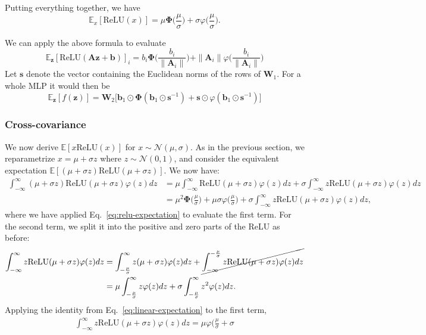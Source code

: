 \documentclass{article}
\theoremstyle{plain}
\theoremstyle{definition}
\theoremstyle{remark}
\newcommand{\Pphi}{\boldsymbol{\Phi}}
\newcommand{\E}{\mathbb{E}}
\newcommand{\zz}{\boldsymbol{z}}
\begin{document}
Putting everything together, we have
\begin{equation}\label{eq:relu-expectation}
    \E_x [\mathrm{ReLU}(x)] = \mu \Pphi \Big ( \frac{\mu}{\sigma} \Big ) + \sigma \varphi \Big (\frac{\mu}{\sigma} \Big ).
\end{equation}

We can apply the above formula to evaluate
\begin{equation}
    \E_{\zz}[\mathrm{ReLU}(\mathbf{A}\zz + \mathbf{b})]_i = b_i \Pphi \Big ( \frac{b_i}{\| \mathbf{A}_i \|} \Big ) + \| \mathbf{A}_i \| \varphi \Big ( \frac{b_i}{\| \mathbf{A}_i \|} \Big )
\end{equation}
Let $\boldsymbol{s}$ denote the vector containing the Euclidean norms of the rows of $\mathbf{W}_1$. For a whole MLP it would then be
\begin{equation}
    \E_{\zz}[f(\zz)] = \mathbf{W}_2 \Big [ \mathbf{b}_1 \odot \Pphi (\mathbf{b}_1 \odot \boldsymbol{s}^{-1} ) + \boldsymbol{s} \odot \varphi ( \mathbf{b}_1 \odot \boldsymbol{s}^{-1} ) \Big ]
\end{equation}

\subsubsection{Cross-covariance}

We now derive $\E[x \mathrm{ReLU}(x)]$ for $x \sim \mathcal{N}(\mu, \sigma)$. As in the previous section, we reparametrize $x = \mu + \sigma z$ where $z \sim \mathcal{N}(0, 1)$, and consider the equivalent expectation $\E[(\mu + \sigma z) \mathrm{ReLU}(\mu + \sigma z)]$. We now have:
\begin{align}
    \int_{-\infty}^{\infty} (\mu + \sigma z) \mathrm{ReLU}(\mu + \sigma z) \varphi(z) dz &= \mu \int_{-\infty}^{\infty} \mathrm{ReLU}(\mu + \sigma z) \varphi(z) dz + \sigma \int_{-\infty}^{\infty} z \mathrm{ReLU}(\mu + \sigma z) \varphi(z) dz \\
    &= \mu^2 \Pphi \Big ( \frac{\mu}{\sigma} \Big ) + \mu \sigma \varphi \Big (\frac{\mu}{\sigma} \Big ) + \sigma \int_{-\infty}^{\infty} z \mathrm{ReLU}(\mu + \sigma z) \varphi(z) dz,
\end{align}
where we have applied Eq.~\ref{eq:relu-expectation} to evaluate the first term. For the second term, we split it into the positive and zero parts of the ReLU as before:
\begin{align}
    \int_{-\infty}^{\infty} z \mathrm{ReLU}(\mu + \sigma z) \varphi(z) dz &= \int_{-\frac{\mu}{\sigma}}^{\infty} z (\mu + \sigma z) \varphi(z) dz + \cancel{\int_{-\infty}^{-\frac{\mu}{\sigma}} z \mathrm{ReLU}(\mu + \sigma z) \varphi(z) dz} \\
    &= \mu \int_{-\frac{\mu}{\sigma}}^{\infty} z \varphi(z) dz + \sigma \int_{-\frac{\mu}{\sigma}}^{\infty} z^2 \varphi(z) dz.
\end{align}
Applying the identity from Eq.~\ref{eq:linear-expectation} to the first term,
\begin{align}
    \int_{-\infty}^{\infty} z \mathrm{ReLU}(\mu + \sigma z) \varphi(z) dz = \mu \varphi(\frac{\mu}{\sigma} + \sigma 
\end{align}
\end{document}

